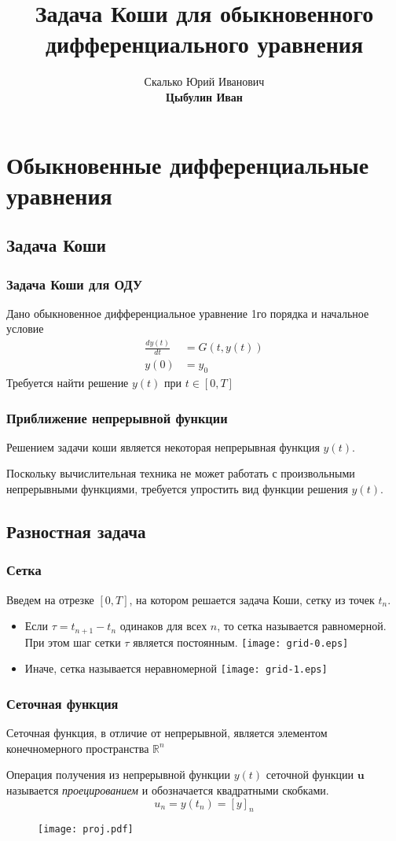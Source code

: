 \documentclass[apectratio=43,unicode]{beamer}
\title[Задача Коши]{Задача Коши для обыкновенного дифференциального уравнения}
\author[Цыбулин И.В.]{Скалько Юрий Иванович\\
\textbf{Цыбулин Иван}}
\date{}
\begin{document}
\begin{frame}[plain]
\titlepage
\end{frame}

\def\L{\mathcal{L}}

\section{Обыкновенные дифференциальные уравнения}
\subsection{Задача Коши}
\begin{frame}\frametitle{Задача Коши для ОДУ}
	Дано обыкновенное дифференциальное уравнение 1го порядка и начальное условие
	\begin{align*}
	\frac{dy(t)}{dt} &= G(t, y(t))\\
	y(0) &= y_0
	\end{align*}
	Требуется найти решение $y(t)$ при $t \in [0, T]$
\end{frame}

\begin{frame}\frametitle{Приближение непрерывной функции}
	Решением задачи коши является некоторая непрерывная функция $y(t)$.

	Поскольку вычислительная техника не может работать с произвольными непрерывными функциями,
	требуется упростить вид функции решения $y(t)$.
\end{frame}

\subsection{Разностная задача}
\begin{frame}\frametitle{Сетка}
	Введем на отрезке $[0, T]$, на котором решается задача Коши, сетку из точек $t_n$.
	\begin{itemize}
	\item Если $\tau = t_{n+1} - t_n$ одинаков для всех $n$, то сетка называется 
		равномерной. При этом шаг сетки $\tau$ является постоянным.
	\texttt{[image: grid-0.eps]}
	\item Иначе, сетка называется неравномерной
	\texttt{[image: grid-1.eps]}
	\end{itemize}
\end{frame}

\begin{frame}\frametitle{Сеточная функция}
	Сеточная функция, в отличие от непрерывной, является элементом конечномерного пространства $\mathbb{R}^n$

	Операция получения из непрерывной функции $y(t)$ сеточной функции $\mathbf{u}$ 
	называется \emph{проецированием} и обозначается квадратными скобками.
	$$
	u_n = y(t_n) = [y]_n
	$$
	\begin{figure}%
	\texttt{[image: proj.pdf]}%
	\end{figure}
\end{frame}
\end{document}
